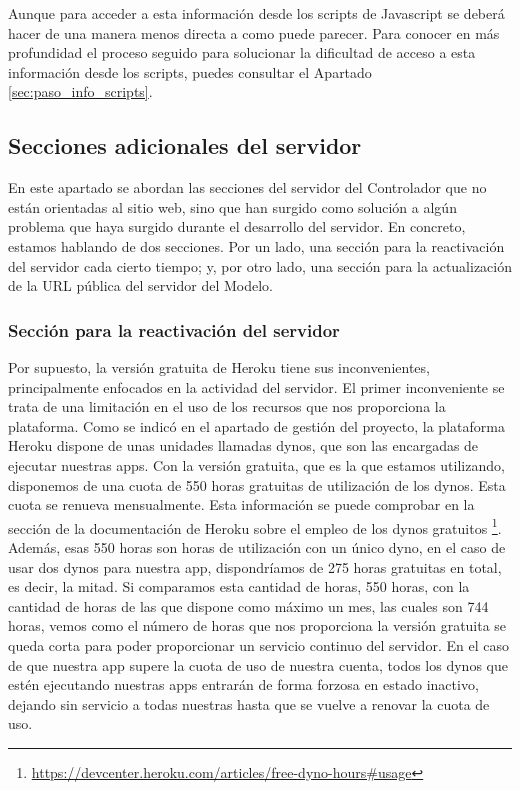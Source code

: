 Aunque para acceder a esta información desde los scripts de Javascript se deberá hacer de una manera menos directa a como puede parecer. Para conocer en más profundidad el proceso seguido para solucionar la dificultad de acceso a esta información desde los scripts, puedes consultar el Apartado \ref{sec:paso_info_scripts}.

\subsection{Secciones adicionales del servidor}

En este apartado se abordan las secciones del servidor del Controlador que no están orientadas al sitio web, sino que han surgido como solución a algún problema que haya surgido durante el desarrollo del servidor. En concreto, estamos hablando de dos secciones. Por un lado, una sección para la reactivación del servidor cada cierto tiempo; y, por otro lado, una sección para la actualización de la URL pública del servidor del Modelo.

\subsubsection*{Sección para la reactivación del servidor}

Por supuesto, la versión gratuita de Heroku tiene sus inconvenientes, principalmente enfocados en la actividad del servidor. El primer inconveniente se trata de una limitación en el uso de los recursos que nos proporciona la plataforma. Como se indicó en el apartado de gestión del proyecto, la plataforma Heroku dispone de unas unidades llamadas dynos, que son las encargadas de ejecutar nuestras apps. Con la versión gratuita, que es la que estamos utilizando, disponemos de una cuota de 550 horas gratuitas de utilización de los dynos. Esta cuota se renueva mensualmente. Esta información se puede comprobar en la sección de la documentación de Heroku sobre el empleo de los dynos gratuitos \footnote{\url{https://devcenter.heroku.com/articles/free-dyno-hours#usage}}. Además, esas 550 horas son horas de utilización con un único dyno, en el caso de usar dos dynos para nuestra app, dispondríamos de 275 horas gratuitas en total, es decir, la mitad. Si comparamos esta cantidad de horas, 550 horas, con la cantidad de horas de las que dispone como máximo un mes, las cuales son 744 horas, vemos como el número de horas que nos proporciona la versión gratuita se queda corta para poder proporcionar un servicio continuo del servidor. En el caso de que nuestra app supere la cuota de uso de nuestra cuenta, todos los dynos que estén ejecutando nuestras apps entrarán de forma forzosa en estado inactivo, dejando sin servicio a todas nuestras hasta que se vuelve a renovar la cuota de uso.

